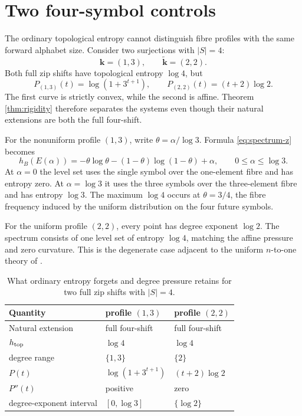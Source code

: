 \section{Two four-symbol controls}\label{sec:examples}

The ordinary topological entropy cannot distinguish fibre profiles with the
same forward alphabet size.  Consider two surjections with $|S|=4$:
\[
 \mathbf k=(1,3),
 \qquad
 \widetilde{\mathbf k}=(2,2).
\]
Both full zip shifts have topological entropy $\log4$, but
\[
 P_{(1,3)}(t)=\log(1+3^{t+1}),
 \qquad
 P_{(2,2)}(t)=(t+2)\log2.
 \tag{6.1}\label{eq:example-pressure}
\]
The first curve is strictly convex, while the second is affine.  Theorem
\ref{thm:rigidity} therefore separates the systems even though their natural
extensions are both the full four-shift.

For the nonuniform profile $(1,3)$, write
$\theta=\alpha/\log3$.  Formula \eqref{eq:spectrum-z} becomes
\[
 h_B(E(\alpha))
 =-\theta\log\theta-(1-\theta)\log(1-\theta)+\alpha,
 \qquad 0\leq\alpha\leq\log3.
 \tag{6.2}\label{eq:binary-spectrum}
\]
At $\alpha=0$ the level set uses the single symbol over the one-element
fibre and has entropy zero.  At $\alpha=\log3$ it uses the three symbols over
the three-element fibre and has entropy $\log3$.  The maximum $\log4$ occurs
at $\theta=3/4$, the fibre frequency induced by the uniform distribution on
the four future symbols.

For the uniform profile $(2,2)$, every point has degree exponent $\log2$.
The spectrum consists of one level set of entropy $\log4$, matching the
affine pressure and zero curvature.  This is the degenerate case adjacent to
the uniform $n$-to-one theory of \citet{MehdipourJangjooye2025}.

\begin{table}[t]
\centering
\caption{What ordinary entropy forgets and degree pressure retains for two
full zip shifts with $|S|=4$.}\label{tab:example}
\begin{tabularx}{\textwidth}{@{}lYY@{}}
\toprule
Quantity & profile $(1,3)$ & profile $(2,2)$\\
\midrule
Natural extension & full four-shift & full four-shift\\
$h_{\rm top}$ & $\log4$ & $\log4$\\
degree range & $\{1,3\}$ & $\{2\}$\\
$P(t)$ & $\log(1+3^{t+1})$ & $(t+2)\log2$\\
$P''(t)$ & positive & zero\\
degree-exponent interval & $[0,\log3]$ & $\{\log2\}$\\
\bottomrule
\end{tabularx}
\end{table}
